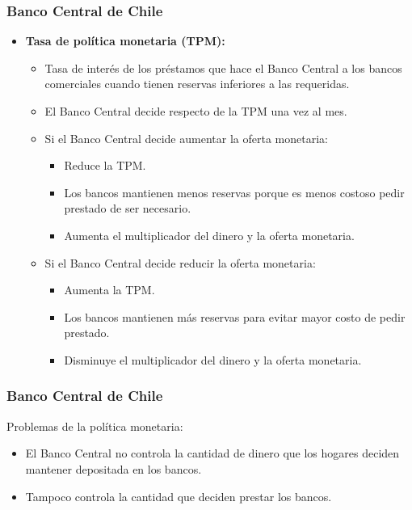 \documentclass[dvipsnames,table,leqno]{beamer}
\begin{document}
		\begin{frame}
			\frametitle{Banco Central de Chile}
			\begin{itemize}
				\item \textbf{Tasa de política monetaria (TPM):} 
					\begin{itemize}
						\item Tasa de interés de los préstamos que hace el Banco Central a los bancos comerciales cuando tienen reservas inferiores a las requeridas.
						\item El Banco Central decide respecto de la TPM una vez al mes.
						\item Si el Banco Central decide aumentar la oferta monetaria:
							\begin{itemize}
								\item Reduce la TPM.
								\item Los bancos mantienen menos reservas porque es menos costoso pedir prestado de ser necesario.
								\item Aumenta el multiplicador del dinero y la oferta monetaria.
							\end{itemize}
						\item Si el Banco Central decide reducir la oferta monetaria:
							\begin{itemize}
								\item Aumenta la TPM.
								\item Los bancos mantienen más reservas para evitar mayor costo de pedir prestado.
								\item Disminuye el multiplicador del dinero y la oferta monetaria.
							\end{itemize}
					\end{itemize}
			\end{itemize}
		\end{frame}

		\begin{frame}
			\frametitle{Banco Central de Chile}
			Problemas de la política monetaria:
			\begin{itemize}
				\item El Banco Central no controla la cantidad de dinero que los hogares deciden mantener depositada en los bancos.
				\item Tampoco controla la cantidad que deciden prestar los bancos.
			\end{itemize}
		\end{frame}
\end{document}

